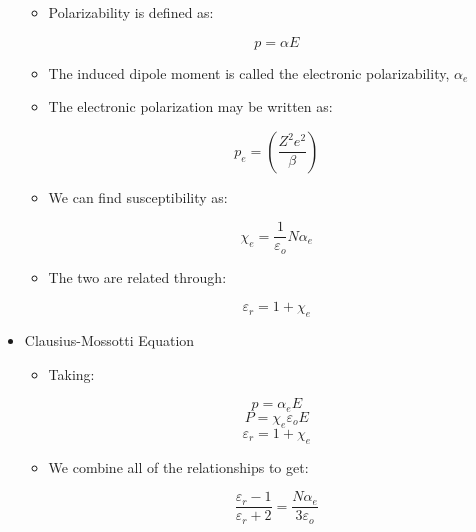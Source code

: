 \begin{itemize}
    \begin{itemize}

      \item Polarizability is defined as:

        $$p=\alpha E$$

      \item The induced dipole moment is called the electronic polarizability, $\alpha_e$

      \item The electronic polarization may be written as:

        $$p_e=\left( \frac{Z^2e^2}{\beta} \right)$$

      \item We can find susceptibility as:

        $$\chi_e=\frac{1}{\varepsilon_o}N\alpha_e$$

      \item The two are related through:

        $$\varepsilon_r=1+\chi_e$$

    \end{itemize}

  \item Clausius-Mossotti Equation

    \begin{itemize}

      \item Taking:

        $$p=\alpha_eE$$
        $$P=\chi_e\varepsilon_oE$$
        $$\varepsilon_r=1+\chi_e$$

      \item We combine all of the relationships to get:

        $$\frac{\varepsilon_r-1}{\varepsilon_r+2}=\frac{N\alpha_e}{3\varepsilon_o}$$

    \end{itemize}

\end{itemize}



